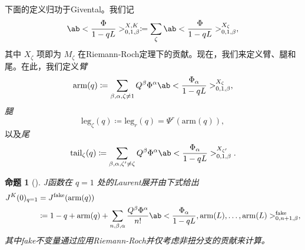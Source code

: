 \documentclass{amsart}
\newtheorem{prop}[thm]{命题}
\theoremstyle{definition}
\theoremstyle{remark}
\theoremstyle{plain}
\theoremstyle{definition}
\theoremstyle{remark}
\newcommand{\mr}[1]{\mathrm{#1}}
\newcommand{\1}{\mathbf{1}}
\newcommand{\2}{\mathbf{2}}
\newcommand{\3}{\mathbf{3}}
\begin{document}
%
%

下面的定义归功于Givental。我们记
\[ \ab<\frac{\Phi}{1-qL}>_{0,1,\beta}^{X,K} \coloneqq \sum_{\zeta} \ab<\frac{\Phi}{1-qL}>_{0,1,\beta}^{X_{\zeta}}, \]
其中 \(X_{\zeta}\) 项即为 \(M_{\zeta}\) 在Riemann-Roch定理下的贡献。现在，我们来定义臂、腿和尾。在此，我们定义\textit{臂}
\[ \mr{arm}(q) \coloneqq \sum_{\beta, \alpha, \zeta \neq 1} Q^{\beta} \Phi^{\alpha}\ab<\frac{\Phi_{\alpha}}{1-qL}>_{0,1,\beta}^{X_{\zeta}}, \]
\textit{腿}
\[ \mr{leg}_{\zeta}(q) \coloneqq \mr{leg}_r(q) = \Psi^r (\mr{arm}(q)), \]
以及\textit{尾}
\[ \mr{tail}_{\zeta}(q) \coloneqq \sum_{\beta, \alpha, \zeta' \neq \zeta} Q^{\beta} \Phi^{\alpha} \ab<\frac{\Phi_{\alpha}}{1-qL}>_{0,1,\beta}^{X_{\zeta'}}. \]

\begin{prop}[{\cite{GiventalTonita2014}}]
    J函数在 \(q = 1\) 处的Laurent展开由下式给出
    \begin{align*}
        J^K(0)_{q=1} &= J^{\mr{fake}}(\mr{arm}(q)) \\
        &\coloneqq 1-q + \mr{arm}(q) + \sum_{n,\beta,\alpha} \frac{Q^{\beta}\Phi^{\alpha}}{n!} \ab<\frac{\Phi_{\alpha}}{1-qL}, \mr{arm}(L), \ldots, \mr{arm}(L)>_{0,n+1,\beta}^{\mr{fake}},
    \end{align*}
    其中fake不变量通过应用Riemann-Roch并仅考虑非扭分支的贡献来计算。
\end{prop}
\end{document}
